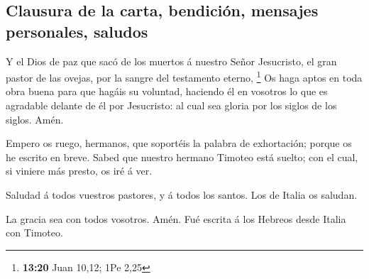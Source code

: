 \hypertarget{clausura-de-la-carta-bendiciuxf3n-mensajes-personales-saludos}{%
\subsection{Clausura de la carta, bendición, mensajes personales,
saludos}\label{clausura-de-la-carta-bendiciuxf3n-mensajes-personales-saludos}}

 Y el Dios de paz que sacó de los muertos á nuestro Señor
Jesucristo, el gran pastor de las ovejas, por la sangre del testamento
eterno, \footnote{\textbf{13:20} Juan 10,12; 1Pe 2,25}  Os
haga aptos en toda obra buena para que hagáis su voluntad, haciendo él
en vosotros lo que es agradable delante de él por Jesucristo: al cual
sea gloria por los siglos de los siglos. Amén.

 Empero os ruego, hermanos, que soportéis la palabra de
exhortación; porque os he escrito en breve.  Sabed que
nuestro hermano Timoteo está suelto; con el cual, si viniere más presto,
os iré á ver.

 Saludad á todos vuestros pastores, y á todos los santos.
Los de Italia os saludan.

 La gracia sea con todos vosotros. Amén. Fué escrita á los
Hebreos desde Italia con Timoteo.
